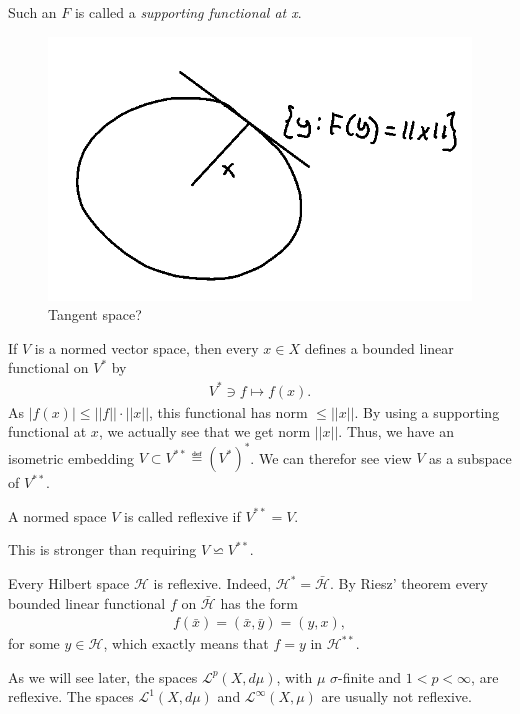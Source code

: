 Such an \(F\) is called a \emph{supporting functional at x}.
\begin{figure}[H]
    \centering
    \includegraphics[scale=0.4]{../Figs/hanah_banach1.png}
    \caption{Tangent space?}
\end{figure}
If \(V\) is a normed vector space, then every \(x\in X\) defines a bounded linear functional on \(V^*\) by 
\begin{align*}
    V^*\ni f\mapsto f(x).
\end{align*}
As \(|f(x)|\leq ||f||\cdot ||x||\), this functional has norm \(\leq ||x||\). By using a supporting functional at \(x\), we actually see that
we get norm \(||x||\). Thus, we have an isometric embedding \(V\subset V^{**}\eqdef (V^*)^*\). We can therefor see view \(V\) as a subspace
of \(V^{**}\).
\begin{definition}
    A normed space \(V\) is called reflexive if \(V^{**}=V\).
\end{definition}
\begin{remark}
    This is stronger than requiring \(V\backsimeq V^{**}\).
\end{remark}
\begin{remark}
    Every Hilbert space \(\mathcal{H}\) is reflexive. Indeed, \(\mathcal{H}^*=\bar{\mathcal{H}}\). By Riesz' theorem every bounded linear 
    functional \(f\) on \(\bar{\mathcal{H}}\) has the form
    \begin{align*}
        f(\bar{x}) = (\bar{x}, \bar{y}) = (y,x),
    \end{align*}
    for some \(y\in\mathcal{H}\), which exactly means that \(f=y\) in \(\mathcal{H}^{**}\).

    As we will see later, the spaces \(\mathcal{L}^{p}(X,d\mu)\), with \(\mu\) \(\sigma\)-finite and \(1<p<\infty\), are reflexive. The spaces
    \(\mathcal{L}^{1}(X, d\mu)\) and \(\mathcal{L}^{\infty}(X,\mu)\) are usually not reflexive.
\end{remark}
